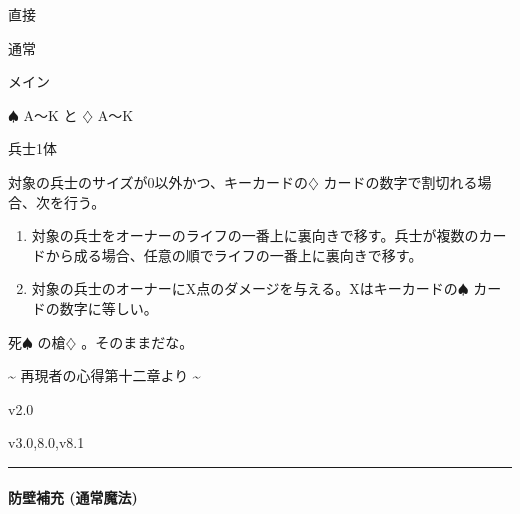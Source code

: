 \documentclass[letterpaper,10pt,dvipdfmx]{sphinxmanual}
\begin{document}
\sphinxAtStartPar
{} 直接

\sphinxAtStartPar
{} 通常

\sphinxAtStartPar
{} メイン

\sphinxAtStartPar
{} {\normalsize $\spadesuit$} A〜K と {\normalsize $\diamondsuit$} A〜K

\sphinxAtStartPar
{}

\sphinxAtStartPar
兵士1体

\sphinxAtStartPar
{}

\sphinxAtStartPar
対象の兵士のサイズが0以外かつ、キーカードの{\normalsize $\diamondsuit$} カードの数字で割切れる場合、次を行う。
\begin{enumerate}
%
\item {} 
\sphinxAtStartPar
対象の兵士をオーナーのライフの一番上に裏向きで移す。兵士が複数のカードから成る場合、任意の順でライフの一番上に裏向きで移す。

\item {} 
\sphinxAtStartPar
対象の兵士のオーナーにX点のダメージを与える。Xはキーカードの{\normalsize $\spadesuit$} カードの数字に等しい。

\end{enumerate}

\sphinxAtStartPar
{}

\sphinxAtStartPar
死{\normalsize $\spadesuit$} の槍{\normalsize $\diamondsuit$} 。そのままだな。

\sphinxAtStartPar
{}

\sphinxAtStartPar
{}

\sphinxAtStartPar
\textasciitilde{} 再現者の心得第十二章より \textasciitilde{}

\sphinxAtStartPar
{}  v2.0

\sphinxAtStartPar
{}  v3.0,8.0,v8.1


\bigskip\hrule\bigskip



\paragraph{防壁補充 (通常魔法)}
\label{\detokenize{auto/actionlist:act-addbulwark}}\label{\detokenize{auto/actionlist:id35}}
\sphinxAtStartPar
{}
\end{document}
